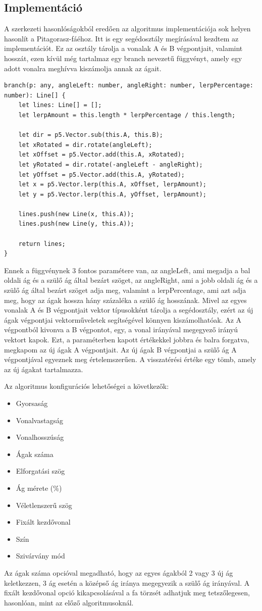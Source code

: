 \subsection*{Implementáció}
A szerkezeti hasonlóságokból eredően az algoritmus implementációja sok helyen hasonlít a Pitagorasz-fáéhoz. Itt is egy segédosztály megírásával kezdtem az implementációt. Ez az osztály tárolja a vonalak A és B végpontjait, valamint hosszát, ezen kívül még tartalmaz egy branch nevezetű függvényt, amely egy adott vonalra meghívva kiszámolja annak az ágait. 
\begin{lstlisting}
branch(p: any, angleLeft: number, angleRight: number, lerpPercentage: number): Line[] {
	let lines: Line[] = [];
	let lerpAmount = this.length * lerpPercentage / this.length;
	
	let dir = p5.Vector.sub(this.A, this.B);
	let xRotated = dir.rotate(angleLeft);
	let xOffset = p5.Vector.add(this.A, xRotated);
	let yRotated = dir.rotate(-angleLeft - angleRight);
	let yOffset = p5.Vector.add(this.A, yRotated);
	let x = p5.Vector.lerp(this.A, xOffset, lerpAmount);
	let y = p5.Vector.lerp(this.A, yOffset, lerpAmount);
	
	lines.push(new Line(x, this.A));
	lines.push(new Line(y, this.A));
	
	return lines;
}
\end{lstlisting}
Ennek a függvénynek 3 fontos paramétere van, az angleLeft, ami megadja a bal oldali ág és a szülő ág által bezárt szöget, az angleRight, ami a jobb oldali ág és a szülő ág által bezárt szöget adja meg, valamint a lerpPercentage, ami azt adja meg, hogy az ágak hossza hány százaléka a szülő ág hosszának. Mivel az egyes vonalak A és B végpontjait vektor típusokként tárolja a segédosztály, ezért az új ágak végpontjai vektorműveletek segítségével könnyen kiszámolhatóak. Az A végpontból kivonva a B végpontot, egy, a vonal irányával megegyező irányú vektort kapok. Ezt, a paraméterben kapott értékekkel jobbra és balra forgatva, megkapom az új ágak A végpontjait. Az új ágak B végpontjai a szülő ág A végpontjával egyeznek meg értelemszerűen. A visszatérési értéke egy tömb, amely az új ágakat tartalmazza.
\par Az algoritmus konfigurációs lehetőségei a következők:
\begin{itemize}
	\item Gyorsaság
	\item Vonalvastagság
	\item Vonalhosszúság
	\item Ágak száma
	\item Elforgatási szög
	\item Ág mérete (\%)
	\item Véletlenszerű szög
	\item Fixált kezdővonal
	\item Szín
	\item Szivárvány mód
\end{itemize}
Az ágak száma opcióval megadható, hogy az egyes ágakból 2 vagy 3 új ág keletkezzen, 3 ág esetén a középső ág iránya megegyezik a szülő ág irányával. A fixált kezdővonal opció kikapcsolásával a fa törzsét adhatjuk meg tetszőlegesen, hasonlóan, mint az előző algoritmusoknál.

